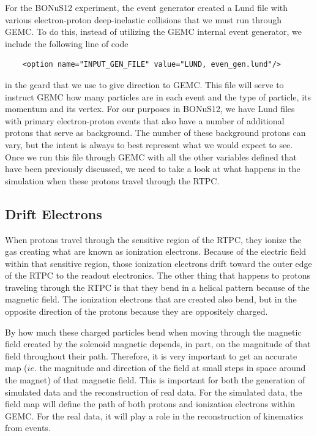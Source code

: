 For the BONuS12 experiment, the event generator created a Lund file with various electron-proton deep-inelastic collisions that we must run through GEMC. To do this, instead of utilizing the GEMC internal event generator, we include the following line of code
\begin{lstlisting}
	<option name="INPUT_GEN_FILE" value="LUND, even_gen.lund"/>
\end{lstlisting}
in the gcard that we use to give direction to GEMC. This file will serve to instruct GEMC how many particles are in each event and the type of particle, its momentum and its vertex. For our purposes in BONuS12, we have Lund files with primary electron-proton events that also have a number of additional protons that serve as background. The number of these background protons can vary, but the intent is always to best represent what we would expect to see. Once we run this file through GEMC with all the other variables defined that have been previously discussed, we need to take a look at what happens in the simulation when these protons travel through the RTPC.

\subsection{Drift Electrons} \label{ss:drift_e}
When protons travel through the sensitive region of the RTPC, they ionize the gas creating what are known as ionization electrons. Because of the electric field within that sensitive region, those ionization electrons drift toward the outer edge of the RTPC to the readout electronics. The other thing that happens to protons traveling through the RTPC is that they bend in a helical pattern because of the magnetic field. The ionization electrons that are created also bend, but in the opposite direction of the protons because they are oppositely charged.
  
By how much these charged particles bend when moving through the magnetic field created by the solenoid magnetic depends, in part, on the magnitude of that field throughout their path. Therefore, it is very important to get an accurate map ($ie.$ the magnitude and direction of the field at small steps in space around the magnet) of that magnetic field. This is important for both the generation of simulated data and the reconstruction of real data. For the simulated data, the field map will define the path of both protons and ionization electrons within GEMC. For the real data, it will play a role in the reconstruction of kinematics from events.


